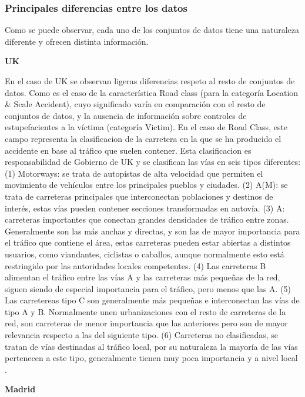 \documentclass{uathesis-es}
\begin{document}
\subsubsection{Principales diferencias entre los datos}

Como se puede observar, cada uno de los conjuntos de datos tiene una naturaleza diferente y ofrecen distinta información.

\textbf{UK}

En el caso de UK se observan ligeras diferencias respeto al resto de conjuntos de datos. Como es el caso de la característica Road class (para la categoría Location \& Scale Accident), cuyo significado varía en comparación con el resto de conjuntos de datos, y la ausencia de información sobre controles de estupefacientes a la víctima (categoría Victim). En el caso de Road Class, este campo representa la clasificacion de la carretera en la que se ha producido el accidente en base al tráfico que suelen contener. Esta clasificacion es responsabilidad de Gobierno de UK y se clasifican las vías en seis tipos diferentes: (1) Motorways: se trata de autopistas de alta velocidad que permiten el movimiento de vehículos entre los principales pueblos y ciudades. (2) A(M): se trata de carreteras principales que interconectan poblaciones y destinos de interés, estas vías pueden contener secciones transformadas en autovía. (3) A: carreteras importantes que conectan grandes densidades de tráfico entre zonas. Generalmente son las más anchas y directas, y son las de mayor importancia para el tráfico que contiene el área, estas carreteras pueden estar abiertas a distintos usuarios, como viandantes, ciclistas o caballos, aunque normalmente esto está restringido por las autoridades locales competentes. (4) Las carreteras B alimentan el tráfico entre las vías A y las carreteras más pequeñas de la red, siguen siendo de especial importancia para el tráfico, pero menos que las A. (5) Las carretereas tipo C son generalmente más pequeñas e interconectan las vías de tipo A y B. Normalmente unen urbanizaciones con el resto de carreteras de la red, son carreteras de menor importancia que las anteriores pero son de mayor relevancia respecto a las del siguiente tipo. (6) Carreteras no clasificadas, se tratan de vías destinadas al tráfico local, por su naturaleza la mayoría de las vías pertenecen a este tipo, generalmente tienen muy poca importancia y a nivel local \cite{UKDepartmentForTransportRoadClassification}.


\textbf{Madrid}
\end{document}
